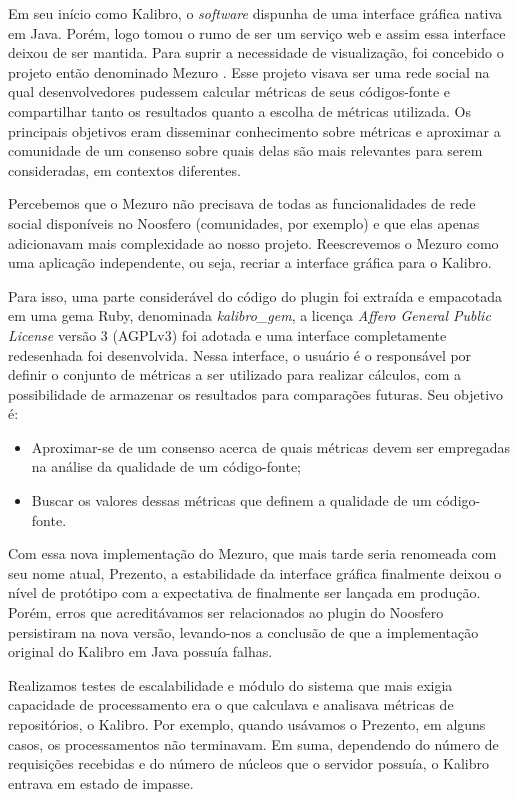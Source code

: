\documentclass{llncs}
\begin{document}
Em seu início como Kalibro, o \textit{software} dispunha de uma interface
gráfica nativa em Java. Porém, logo tomou o rumo de ser um serviço web e assim
essa interface deixou de ser mantida. Para suprir a necessidade de
visualização, foi concebido o projeto então denominado Mezuro
\cite{meirelles2013monitoramento}. Esse projeto visava ser uma rede social na
qual desenvolvedores pudessem calcular métricas de seus códigos-fonte e
compartilhar tanto os resultados quanto a escolha de métricas utilizada. Os
principais objetivos eram disseminar conhecimento sobre métricas e aproximar a
comunidade de um consenso sobre quais delas são mais relevantes para serem
consideradas, em contextos diferentes.

Percebemos que o Mezuro não precisava de todas as funcionalidades de rede
social disponíveis no Noosfero (comunidades, por exemplo) e que elas apenas
adicionavam mais complexidade ao nosso projeto. Reescrevemos o Mezuro como uma
aplicação independente, ou seja, recriar a interface gráfica para o Kalibro.

 Para isso, uma parte considerável do código do plugin foi extraída e
empacotada em uma gema Ruby, denominada \textit{kalibro\_gem}, a licença
\textit{Affero General Public License} versão 3 (AGPLv3) foi adotada e uma
interface completamente redesenhada foi desenvolvida. Nessa interface, o
usuário é o responsável por definir o conjunto de métricas a ser utilizado para
realizar cálculos, com a possibilidade de armazenar os resultados para
comparações futuras. Seu objetivo é:

  \begin{itemize}
    \item Aproximar-se de um consenso acerca de quais métricas devem ser empregadas na análise da qualidade de um código-fonte;
    \item Buscar os valores dessas métricas que definem a qualidade de um código-fonte.
  \end{itemize}

Com essa nova implementação do Mezuro, que mais tarde seria renomeada com seu
nome atual, Prezento, a estabilidade da interface gráfica finalmente deixou o
nível de protótipo com a expectativa de finalmente ser lançada em produção.
Porém, erros que acreditávamos ser relacionados ao plugin do Noosfero
persistiram na nova versão, levando-nos a conclusão de que a implementação
original do Kalibro em Java possuía falhas.

Realizamos testes de escalabilidade e módulo do sistema que mais exigia
capacidade de processamento era o que calculava e analisava métricas de
repositórios, o Kalibro. Por exemplo, quando usávamos o Prezento, em alguns
casos, os processamentos não terminavam. Em suma, dependendo do número de
requisições recebidas e do número de núcleos que o servidor possuía, o Kalibro
entrava em estado de impasse.
\end{document}
